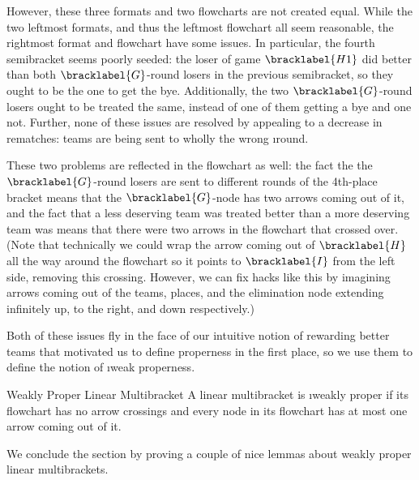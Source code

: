 {    


    However, these three formats and two flowcharts are not created equal. While the two leftmost formats, and thus the leftmost flowchart all seem reasonable, the rightmost format and flowchart have some issues. In particular, the fourth semibracket seems poorly seeded: the loser of game $\bracklabel{H1}$ did better than both $\bracklabel{G}$-round losers in the previous semibracket, so they ought to be the one to get the bye. Additionally, the two $\bracklabel{G}$-round losers ought to be treated the same, instead of one of them getting a bye and one not. Further, none of these issues are resolved by appealing to a decrease in rematches: teams are being sent to wholly the wrong \i{round}.

    These two problems are reflected in the flowchart as well: the fact the the $\bracklabel{G}$-round losers are sent to different rounds of the 4th-place bracket means that the $\bracklabel{G}$-node has two arrows coming out of it, and the fact that a less deserving team was treated better than a more deserving team was means that there were two arrows in the flowchart that crossed over. (Note that technically we could wrap the arrow coming out of $\bracklabel{H}$ all the way around the flowchart so it points to $\bracklabel{I}$ from the left side, removing this crossing. However, we can fix hacks like this by imagining arrows coming out of the teams, places, and the elimination node extending infinitely up, to the right, and down respectively.)

    Both of these issues fly in the face of our intuitive notion of rewarding better teams that motivated us to define properness in the first place, so we use them to define the notion of \i{weak properness}.

    \begin{definition}{Weakly Proper Linear Multibracket}{}
        A linear multibracket is \i{weakly proper} if its flowchart has no arrow crossings and every node in its flowchart has at most one arrow coming out of it.
    \end{definition}

    We conclude the section by proving a couple of nice lemmas about weakly proper linear multibrackets.


}
